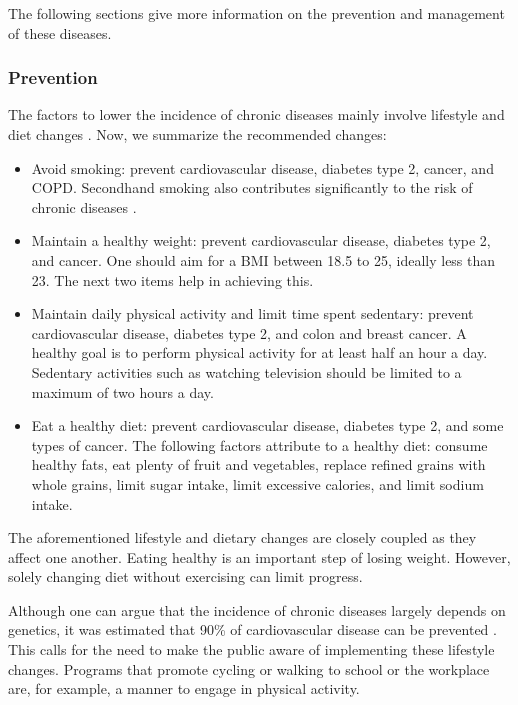     The following sections give more information on the prevention and management of these diseases.

        \subsubsection{Prevention}

        The factors to lower the incidence of chronic diseases mainly involve lifestyle and diet changes \cite{willett2006prevention}. Now, we summarize the recommended changes:
            \begin{itemize}
                \item Avoid smoking: prevent cardiovascular disease, diabetes type 2, cancer, and COPD. Secondhand smoking also contributes significantly to the risk of chronic diseases \cite{us2006health}.
                \item Maintain a healthy weight: prevent cardiovascular disease, diabetes type 2, and cancer. One should aim for a BMI between 18.5 to 25, ideally less than 23. The next two items help in achieving this.
                \item Maintain daily physical activity and limit time spent sedentary: prevent cardiovascular disease, diabetes type 2, and colon and breast cancer. A healthy goal is to perform physical activity for at least half an hour a day. Sedentary activities such as watching television should be limited to a maximum of two hours a day.
                \item Eat a healthy diet: prevent cardiovascular disease, diabetes type 2, and some types of cancer. The following factors attribute to a healthy diet: consume healthy fats, eat plenty of fruit and vegetables, replace refined grains with whole grains, limit sugar intake, limit excessive calories, and limit sodium intake.
            \end{itemize}

        \noindent The aforementioned lifestyle and dietary changes are closely coupled as they affect one another. Eating healthy is an important step of losing weight. However, solely changing diet without exercising can limit progress. 

        Although one can argue that the incidence of chronic diseases largely depends on genetics, it was estimated that 90\% of cardiovascular disease can be prevented \cite{mcgill2008preventing}. This calls for the need to make the public aware of implementing these lifestyle changes. Programs that promote cycling or walking to school or the workplace are, for example, a manner to engage in physical activity.

